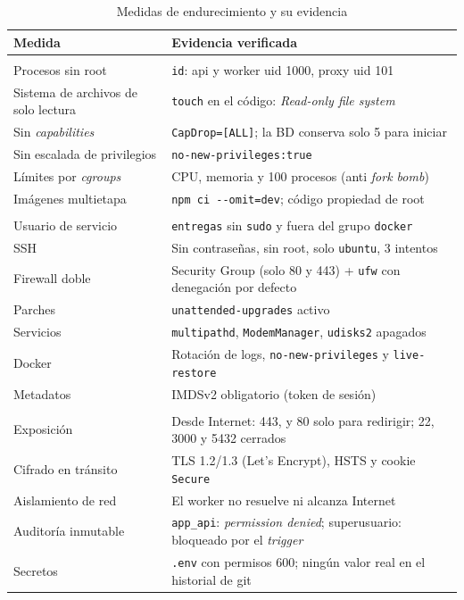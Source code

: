 \documentclass[conference,a4paper]{IEEEtran}
\newcommand{\cod}[1]{\texttt{#1}}
\begin{document}
\begin{table}[!t]
\caption{Medidas de endurecimiento y su evidencia}\label{tab:hardening}
\centering\footnotesize
\begin{tabular}{@{}>{\raggedright\arraybackslash}p{2.9cm}>{\raggedright\arraybackslash}p{5.1cm}@{}}
\toprule
Medida & Evidencia verificada\\
\midrule
\multicolumn{2}{@{}l}{\textit{Contenedores}}\\
Procesos sin root & \cod{id}: api y worker uid 1000, proxy uid 101\\
Sistema de archivos de solo lectura & \cod{touch} en el código: \textit{Read-only file system}\\
Sin \textit{capabilities} & \cod{CapDrop=[ALL]}; la BD conserva solo 5 para iniciar\\
Sin escalada de privilegios & \cod{no-new-privileges:true}\\
Límites por \textit{cgroups} & CPU, memoria y 100 procesos (anti \textit{fork bomb})\\
Imágenes multietapa & \cod{npm ci -{}-omit=dev}; código propiedad de root\\
\midrule
\multicolumn{2}{@{}l}{\textit{Host EC2}}\\
Usuario de servicio & \cod{entregas} sin \cod{sudo} y fuera del grupo \cod{docker}\\
SSH & Sin contraseñas, sin root, solo \cod{ubuntu}, 3 intentos\\
Firewall doble & Security Group (solo 80 y 443) + \cod{ufw} con denegación por defecto\\
Parches & \cod{unattended-upgrades} activo\\
Servicios & \cod{multipathd}, \cod{ModemManager}, \cod{udisks2} apagados\\
Docker & Rotación de logs, \cod{no-new-privileges} y \cod{live-restore}\\
Metadatos & IMDSv2 obligatorio (token de sesión)\\
\midrule
\multicolumn{2}{@{}l}{\textit{Red, datos y secretos}}\\
Exposición & Desde Internet: 443, y 80 solo para redirigir; 22, 3000 y 5432 cerrados\\
Cifrado en tránsito & TLS 1.2/1.3 (Let's Encrypt), HSTS y cookie \cod{Secure}\\
Aislamiento de red & El worker no resuelve ni alcanza Internet\\
Auditoría inmutable & \cod{app\_api}: \textit{permission denied}; superusuario: bloqueado por el \textit{trigger}\\
Secretos & \cod{.env} con permisos 600; ningún valor real en el historial de git\\
\bottomrule
\end{tabular}
\end{table}
\end{document}
